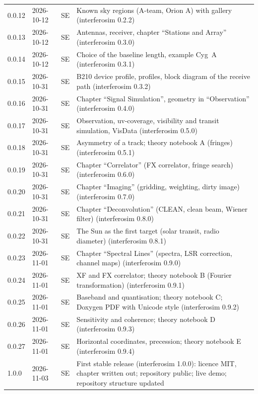 {\begin{longtable}{ll l >{\raggedright\arraybackslash}p{8.4cm}}
    0.0.12 & 2026-10-12 & SE & Known sky regions (A-team, Orion A) with gallery (interferosim 0.2.2) \\
    0.0.13 & 2026-10-12 & SE & Antennas, receiver, chapter \enquote{Stations and Array} (interferosim 0.3.0) \\
    0.0.14 & 2026-10-12 & SE & Choice of the baseline length, example Cyg~A (interferosim 0.3.1) \\
    0.0.15 & 2026-10-31 & SE & B210 device profile, profiles, block diagram of the receive path (interferosim 0.3.2) \\
    0.0.16 & 2026-10-31 & SE & Chapter \enquote{Signal Simulation}, geometry in \enquote{Observation} (interferosim 0.4.0) \\
    0.0.17 & 2026-10-31 & SE & Observation, uv-coverage, visibility and transit simulation, VisData (interferosim 0.5.0) \\
    0.0.18 & 2026-10-31 & SE & Asymmetry of a track; theory notebook A (fringes) (interferosim 0.5.1) \\
    0.0.19 & 2026-10-31 & SE & Chapter \enquote{Correlator} (FX correlator, fringe search) (interferosim 0.6.0) \\
    0.0.20 & 2026-10-31 & SE & Chapter \enquote{Imaging} (gridding, weighting, dirty image) (interferosim 0.7.0) \\
    0.0.21 & 2026-10-31 & SE & Chapter \enquote{Deconvolution} (CLEAN, clean beam, Wiener filter) (interferosim 0.8.0) \\
    0.0.22 & 2026-10-31 & SE & The Sun as the first target (solar transit, radio diameter) (interferosim 0.8.1) \\
    0.0.23 & 2026-11-01 & SE & Chapter \enquote{Spectral Lines} (spectra, LSR correction, channel maps) (interferosim 0.9.0) \\
    0.0.24 & 2026-11-01 & SE & XF and FX correlator; theory notebook B (Fourier transformation) (interferosim 0.9.1) \\
    0.0.25 & 2026-11-01 & SE & Baseband and quantisation; theory notebook C; Doxygen PDF with Unicode style (interferosim 0.9.2) \\
    0.0.26 & 2026-11-01 & SE & Sensitivity and coherence; theory notebook D (interferosim 0.9.3) \\
    0.0.27 & 2026-11-01 & SE & Horizontal coordinates, precession; theory notebook E (interferosim 0.9.4) \\
    1.0.0 & 2026-11-03 & SE & First stable release (interferosim 1.0.0): licence MIT, chapter written out; repository public; live demo; repository structure updated \\

\end{longtable}}
